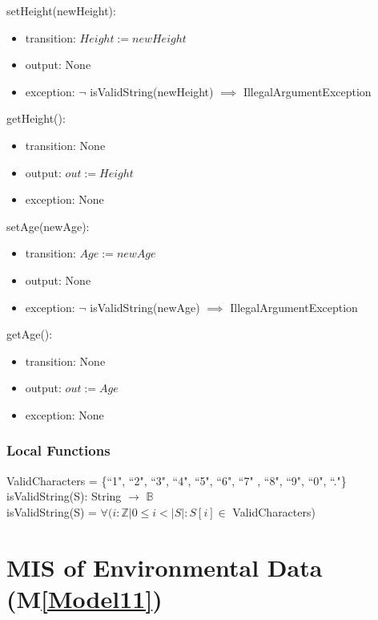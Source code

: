 \documentclass[12pt, titlepage]{article}
\newcommand{\mref}[1]{M\ref{#1}}
\begin{document}
\noindent setHeight(newHeight):
\begin{itemize}
\item transition: $\mathit{Height := newHeight}$
\item output: None
\item exception: $\neg$ isValidString(newHeight) $\implies$
IllegalArgumentException
\end{itemize}

\noindent getHeight():
\begin{itemize}
\item transition: None
\item output: $\mathit{out := Height}$
\item exception: None
\end{itemize}

\noindent setAge(newAge):
\begin{itemize}
\item transition: $\mathit{Age := newAge}$
\item output: None
\item exception: $\neg$ isValidString(newAge) $\implies$
IllegalArgumentException
\end{itemize}

\noindent getAge():
\begin{itemize}
\item transition: None
\item output: $\mathit{out := Age}$
\item exception: None
\end{itemize}

\subsubsection{Local Functions}
ValidCharacters = \{``1", ``2", ``3", ``4", ``5", ``6", ``7"
, ``8", ``9", ``0", ``."\}\\

\noindent isValidString(S): String $\rightarrow$ $\mathbb{B}$ \\

\noindent isValidString(S) = $\forall(i : \mathbb{Z} | 0 \leq
i < |S| : S[i] \in $ ValidCharacters)

\newpage

\section{MIS of Environmental Data (\mref{Model11})}
\end{document}
